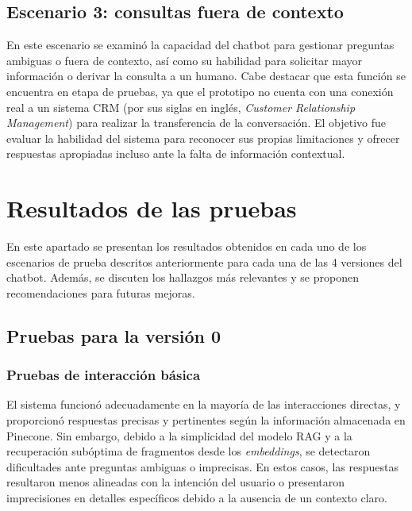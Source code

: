 \subsection{Escenario 3: consultas fuera de contexto}
En este escenario se examinó la capacidad del chatbot para gestionar preguntas ambiguas o fuera de contexto, así como su habilidad para solicitar mayor información o derivar la consulta a un humano. Cabe destacar que esta función se encuentra en etapa de pruebas, ya que el prototipo no cuenta con una conexión real a un sistema CRM (por sus siglas en inglés, \textit{Customer Relationship Management}) para realizar la transferencia de la conversación. El objetivo fue evaluar la habilidad del sistema para reconocer sus propias limitaciones y ofrecer respuestas apropiadas incluso ante la falta de información contextual.


\section{Resultados de las pruebas}
\label{sec:resultadosPruebas}

En este apartado se presentan los resultados obtenidos en cada uno de los escenarios de prueba descritos anteriormente para cada una de las 4 versiones del chatbot. Además, se discuten los hallazgos más relevantes y se proponen recomendaciones para futuras mejoras.



\subsection{Pruebas para la versión 0}
\label{sec:resultadosPruebasV0}

\subsubsection{Pruebas de interacción básica}

El sistema funcionó adecuadamente en la mayoría de las interacciones directas, y proporcionó respuestas precisas y pertinentes según la información almacenada en Pinecone. Sin embargo, debido a la simplicidad del modelo RAG y a la recuperación subóptima de fragmentos desde los \textit{embeddings}, se detectaron dificultades ante preguntas ambiguas o imprecisas. En estos casos, las respuestas resultaron menos alineadas con la intención del usuario o presentaron imprecisiones en detalles específicos debido a la ausencia de un contexto claro.


